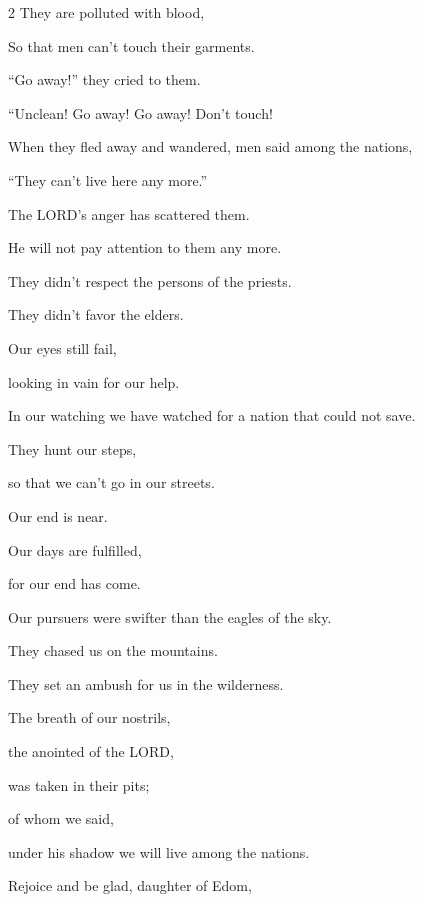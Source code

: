 \begin{multicols}{2}
	They are polluted with blood,
	
	So that men can’t touch their garments.
	\vspace{\baselineskip}
	
	\myverse{}“Go away!” they cried to them.
	
	“Unclean! Go away! Go away! Don’t touch!
	
	When they fled away and wandered, men said among the nations,
	
	“They can’t live here any more.”
	\vspace{\baselineskip}
	
	\myverse{}The LORD’s anger has scattered them.
	
	He will not pay attention to them any more.
	
	They didn’t respect the persons of the priests.
	
	They didn’t favor the elders.
	\vspace{\baselineskip}
	
	\myverse{}Our eyes still fail,
	
	looking in vain for our help.
	
	In our watching we have watched for a nation that could not save.
	\vspace{\baselineskip}
	
	\myverse{}They hunt our steps,
	
	so that we can’t go in our streets.
	
	Our end is near.
	
	Our days are fulfilled,
	
	for our end has come.
	\vspace{\baselineskip}
	
	\myverse{}Our pursuers were swifter than the eagles of the sky.
	
	They chased us on the mountains.
	
	They set an ambush for us in the wilderness.
	\vspace{\baselineskip}
	
	\myverse{}The breath of our nostrils,
	
	the anointed of the LORD,
	
	was taken in their pits;
	
	of whom we said,
	
	under his shadow we will live among the nations.
	\vspace{\baselineskip}
	
	\myverse{}Rejoice and be glad, daughter of Edom,
	

\end{multicols}
